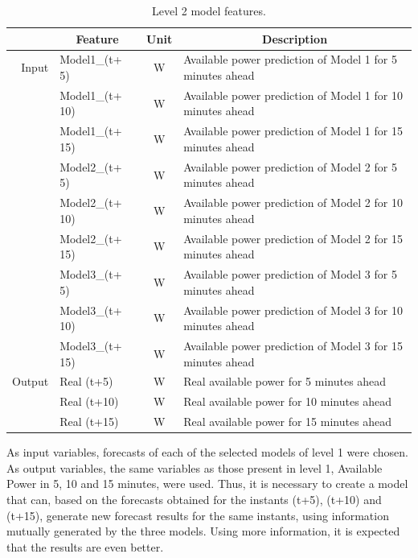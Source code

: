 \begin{table}[htbp]
  \centering
  \caption{Level 2 model features.}
    \begin{tabular}{rlcl}
    \toprule
          & \multicolumn{1}{c}{\textbf{Feature}} & \textbf{Unit} & \multicolumn{1}{c}{\textbf{Description}} \\
    \midrule
    Input & Model1\_(t+ 5) & W     & Available power prediction of Model 1 for 5 minutes ahead \\
          & Model1\_(t+ 10) & W     & Available power prediction of Model 1 for 10 minutes ahead \\
          & Model1\_(t+ 15) & W     & Available power prediction of Model 1 for 15 minutes ahead \\
          & Model2\_(t+ 5) & W     & Available power prediction of Model 2 for 5 minutes ahead \\
          & Model2\_(t+ 10) & W     & Available power prediction of Model 2 for 10 minutes ahead \\
          & Model2\_(t+ 15) & W     & Available power prediction of Model 2 for 15 minutes ahead \\
          & Model3\_(t+ 5) & W     & Available power prediction of Model 3 for 5 minutes ahead \\
          & Model3\_(t+ 10) & W     & Available power prediction of Model 3 for 10 minutes ahead \\
          & Model3\_(t+ 15) & W     & Available power prediction of Model 3 for 15 minutes ahead \\
    \midrule
    Output & Real (t+5) & W     & Real available power for 5 minutes ahead \\
          & Real (t+10) & W     & Real available power for 10 minutes ahead \\
          & Real (t+15) & W     & Real available power for 15 minutes ahead \\
    \end{tabular}%
  \label{table:Enseble}%
\end{table}%

As input variables, forecasts of each of the selected models of level 1 were chosen. As output variables, the same variables as those present in level 1, Available Power in 5, 10 and 15 minutes, were used. Thus, it is necessary to create a model that can, based on the forecasts obtained for the instants (t+5), (t+10) and (t+15), generate new forecast results for the same instants, using information mutually generated by the three models. Using more information, it is expected that the results are even better.

